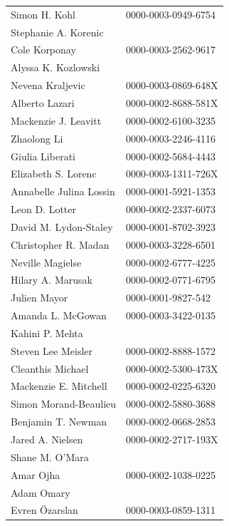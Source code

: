 \documentclass[fleqn,10pt,inline]{wlscirep}
\begin{document}
\begin{appendixbox}
\begin{longtable}{ll}
             Simon H. Kohl & 0000-0003-0949-6754 \\
      Stephanie A. Korenic &                     \\
             Cole Korponay & 0000-0003-2562-9617 \\
       Alyssa K. Kozlowski &                     \\
          Nevena Kraljevic & 0000-0003-0869-648X \\
            Alberto Lazari & 0000-0002-8688-581X \\
      Mackenzie J. Leavitt & 0000-0002-6100-3235 \\
               Zhaolong Li & 0000-0003-2246-4116 \\
           Giulia Liberati & 0000-0002-5684-4443 \\
       Elizabeth S. Lorenc & 0000-0003-1311-726X \\
   Annabelle Julina Lossin & 0000-0001-5921-1353 \\
            Leon D. Lotter & 0000-0002-2337-6073 \\
     David M. Lydon-Staley & 0000-0001-8702-3923 \\
      Christopher R. Madan & 0000-0003-3228-6501 \\
          Neville Magielse & 0000-0002-6777-4225 \\
         Hilary A. Marusak & 0000-0002-0771-6795 \\
              Julien Mayor &  0000-0001-9827-542 \\
         Amanda L. McGowan & 0000-0003-3422-0135 \\
           Kahini P. Mehta &                     \\
        Steven Lee Meisler & 0000-0002-8888-1572 \\
         Cleanthis Michael & 0000-0002-5300-473X \\
     Mackenzie E. Mitchell & 0000-0002-0225-6320 \\
     Simon Morand-Beaulieu & 0000-0002-5880-3688 \\
        Benjamin T. Newman & 0000-0002-0668-2853 \\
          Jared A. Nielsen & 0000-0002-2717-193X \\
           Shane M. O'Mara &                     \\
                 Amar Ojha & 0000-0002-1038-0225 \\
                Adam Omary &                     \\
            Evren Özarslan & 0000-0003-0859-1311 \\

\end{longtable}
\end{appendixbox}
\end{document}
